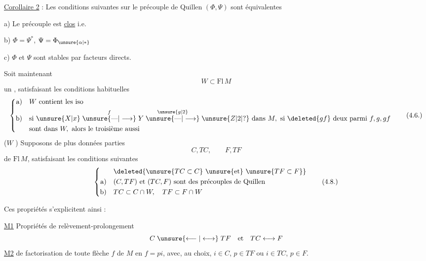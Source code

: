 \uline{Corollaire 2} : Les conditions suivantes sur le précouple de Quillen $(\Phi,\Psi)$ sont équivalentes

a) Le précouple est \uline{clos} i.e.  \inserted{$\Phi=\widetilde\Phi$, $\Psi=\overline\Psi$}

b) $\Phi=\Psi^*$, $\Psi=\Phi_{\unsure{\alpha|*}}$

c) $\Phi$ et $\Psi$ sont stables par facteurs directs.

Soit maintenant
\[
W\subset\mathrm{Fl}\,M
\tag*{(4.5.)}
\]
un , satisfaisant les conditions habituelles
\[
\left\{\begin{aligned}
\text{a)}\quad& W\text{ contient les iso}\\
\text{b)}\quad&\text{si }\unsure{X|x}\overset{f}{\mathrel{\unsure{\text{---}|\longrightarrow}}}Y\overset{\unsure{g|2}}{\mathrel{\unsure{\text{---}|\longrightarrow}}}\unsure{Z|2|?}\text{ dans }M,\text{ si }\deleted{gf}\text{ deux parmi }f,g,gf\\
&\text{sont dans }W,\text{ alors le troisième aussi}
\end{aligned}\right.
\tag*{(4.6.)}
\]
($W$  )  Supposons de plus données   parties
\[
C,TC,\qquad F,TF
\tag*{(4.7)}
\]
de $\mathrm{Fl}\,M$, satisfaisant les conditions suivantes
\[
\left\{\begin{aligned}
&\deleted{\unsure{TC\subset C}\ \unsure{\text{et}}\ \unsure{TF\subset F}}\\
\text{a)}\quad&(C,TF)\text{ et }(TC,F)\text{ sont des précouples de Quillen}\\
\text{b)}\quad&TC\subset C\cap W,\quad TF\subset F\cap W
\end{aligned}\right.
\tag*{(4.8.)}
\]

Ces propriétés s'explicitent ainsi :

\uline{M1} Propriétés de relèvement-prolongement
\[
C\mathrel{\unsure{\longleftarrow|\longleftrightarrow}}TF\quad\text{et}\quad TC\longleftrightarrow F
\]
\uline{M2}  de factorisation de toute flèche $f$ de $M$ en $f=pi$, avec, au choix, $i\in C$, $p\in TF$ ou $i\in TC$, $p\in F$.

